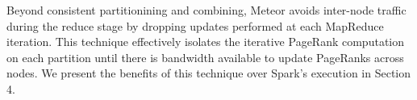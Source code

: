 Beyond consistent partitionining and combining, Meteor avoids inter-node traffic during the reduce stage by dropping updates performed at each MapReduce iteration. This technique effectively isolates the iterative PageRank computation on each partition until there is bandwidth available to update PageRanks across nodes. We present the benefits of this technique over Spark's execution in Section 4.

%

